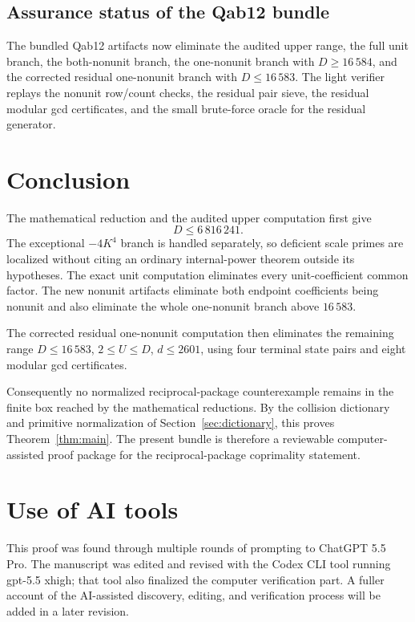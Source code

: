 \documentclass[11pt]{article}
\theoremstyle{definition}
\begin{document}
\subsection*{Assurance status of the Qab12 bundle}

The bundled Qab12 artifacts now eliminate the audited upper range, the full
unit branch, the both-nonunit branch, the one-nonunit branch with
\(D\geq16\,584\), and the corrected residual one-nonunit branch with
\(D\leq16\,583\).  The light verifier replays the nonunit row/count checks,
the residual pair sieve, the residual modular gcd certificates, and the small
brute-force oracle for the residual generator.

\section*{Conclusion}

The mathematical reduction and the audited upper computation first give
\[
 D\leq6\,816\,241.
\]
The exceptional \(-4K^4\) branch is handled separately, so deficient scale
primes are localized without citing an ordinary internal-power theorem outside
its hypotheses.  The exact unit computation eliminates every unit-coefficient
common factor.  The new nonunit artifacts eliminate both endpoint coefficients
being nonunit and also eliminate the whole one-nonunit branch above
\(16\,583\).

The corrected residual one-nonunit computation then eliminates the remaining
range \(D\leq16\,583\), \(2\leq U\leq D\), \(d\leq2601\), using four terminal
state pairs and eight modular gcd certificates.

Consequently no normalized reciprocal-package counterexample remains in the
finite box reached by the mathematical reductions.  By the collision
dictionary and primitive normalization of Section~\ref{sec:dictionary}, this
proves Theorem~\ref{thm:main}.  The present bundle is therefore a reviewable
computer-assisted proof package for the reciprocal-package coprimality
statement.

\section*{Use of AI tools}

This proof was found through multiple rounds of prompting to ChatGPT 5.5 Pro.
The manuscript was edited and revised with the Codex CLI tool running
gpt-5.5 xhigh; that tool also finalized the computer verification part.  A
fuller account of the AI-assisted discovery, editing, and verification
process will be added in a later revision.
\end{document}
